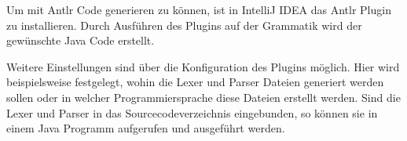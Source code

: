 Um mit Antlr Code generieren zu können, ist  in IntelliJ IDEA das Antlr Plugin zu installieren. Durch Ausführen des Plugins auf der Grammatik wird der gewünschte Java Code erstellt.

Weitere Einstellungen sind über die Konfiguration des Plugins möglich. Hier wird beispielsweise festgelegt, wohin die Lexer und Parser Dateien generiert werden sollen oder in welcher Programmiersprache diese Dateien erstellt werden. 
Sind die Lexer und Parser in das Sourcecodeverzeichnis eingebunden, so können sie in einem Java Programm aufgerufen und ausgeführt werden.
